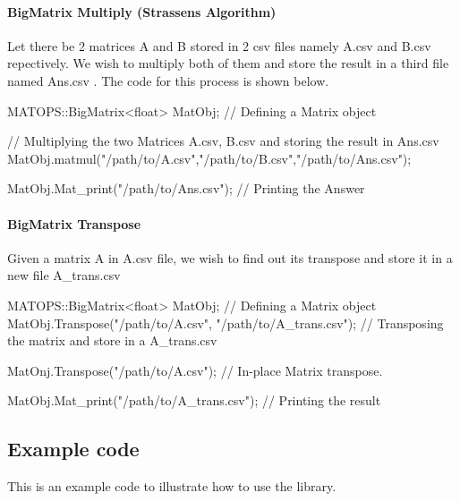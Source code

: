 \paragraph*{Big\+Matrix Multiply (Strassen\textquotesingle{}s Algorithm)}

Let there be 2 matrices A and B stored in 2 csv files namely A.\+csv and B.\+csv repectively. We wish to multiply both of them and store the result in a third file named Ans.\+csv . The code for this process is shown below.


\begin{DoxyCode}
MATOPS::BigMatrix<float> MatObj; // Defining a Matrix object

// Multiplying the two Matrices A.csv, B.csv and storing the result in Ans.csv
MatObj.matmul("/path/to/A.csv","/path/to/B.csv","/path/to/Ans.csv");

MatObj.Mat\_print("/path/to/Ans.csv"); // Printing the Answer
\end{DoxyCode}
 \paragraph*{Big\+Matrix Transpose}

Given a matrix A in A.\+csv file, we wish to find out its transpose and store it in a new file A\+\_\+trans.\+csv


\begin{DoxyCode}
MATOPS::BigMatrix<float> MatObj; // Defining a Matrix object
MatObj.Transpose("/path/to/A.csv", "/path/to/A\_trans.csv"); // Transposing the matrix and store in a
       A\_trans.csv

MatOnj.Transpose("/path/to/A.csv"); // In-place Matrix transpose.

MatObj.Mat\_print("/path/to/A\_trans.csv"); // Printing the result
\end{DoxyCode}


\subsection*{Example code}

This is an example code to illustrate how to use the library.


